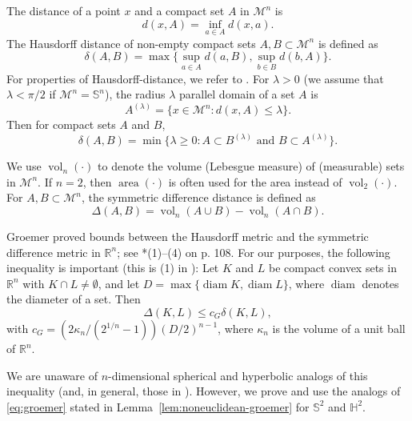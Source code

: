 \documentclass[12pt,reqno]{amsart}
\theoremstyle{remark}
\newcommand{\R}{{\mathbb R}}
\newcommand{\hyp}{{\mathbb H}}
\newcommand{\sph}{{\mathbb S}}
\newcommand{\M}{\mathcal{M}}
\DeclareMathOperator{\diam}{\mathrm{diam}}
\DeclareMathOperator{\area}{\mathrm{area}}
\DeclareMathOperator{\vol}{\mathrm{vol}}
\begin{document}
The distance of a point $x$ and a compact set $A$ in $\M^n$ is 
\[
d(x, A)=\inf_{a\in A}d(x,a).
\]
The Hausdorff distance of non-empty compact sets $A, B\subset \M^n$ is defined as
\begin{equation}\label{def:Hausdorff}
    \delta(A,B)=\max \{\sup_{a\in A}d(a,B), \sup_{b\in B}d(b,A)\}.
\end{equation}
For properties of Hausdorff-distance, we refer to \cite{Sch14}. For $\lambda>0$ (we assume that $\lambda<\pi/2$ if $\M^n=\sph^n$), the radius $\lambda$ parallel domain of a set $A$ is
\[
A^{(\lambda)}=\{x\in \M^n\colon d(x,A)\leq \lambda\}.
\]
Then for compact sets $A$ and $B$, 
\[
\delta (A,B)=\min\{\lambda\geq 0\colon A\subset B^{(\lambda)}\text{ and } B\subset A^{(\lambda)}\}.
\]

We use $\vol_n(\cdot)$ to denote the volume (Lebesgue measure) of (measurable) sets in $\M^n$. If $n=2$, then $\area(\cdot)$ is often used for the area instead of $\vol_2(\cdot)$. For $A, B\subset \M^n$, the symmetric difference distance is defined as 
\begin{equation}\label{def:symmetric-difference}
    \Delta (A, B)=\vol_n (A\cup B)-\vol_n (A\cap B).
\end{equation}

Groemer proved bounds between the Hausdorff metric and the symmetric difference metric in $\R^n$; see \cite{G00}*{(1)--(4) on p. 108}. For our purposes, the following inequality is important (this is (1) in \cite{G00}): Let $K$ and $L$ be compact convex sets in $\R^n$ with $K\cap L\neq\emptyset$, and let $D=\max\{\diam K, \diam L\}$, where $\diam$ denotes the diameter of a set. Then
\begin{equation}\label{eq:groemer}
   \Delta(K, L)\leq c_G \delta (K, L),  
\end{equation}
with $c_G=(2\kappa_n/(2^{1/n}-1))(D/2)^{n-1}$, where $\kappa_n$ is the volume of a unit ball of $\R^n$.

We are unaware of $n$-dimensional spherical and hyperbolic analogs of this inequality (and, in general, those in \cite{G00}). However, we prove and use the analogs of \eqref{eq:groemer} stated in Lemma~\ref{lem:noneuclidean-groemer} for $\sph^2$ and $\hyp^2$.
\end{document}
